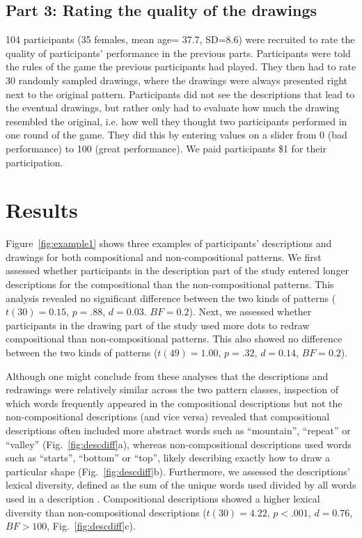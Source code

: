 \documentclass[a4paper,man, floatsintext, natbib]{apa6}
\begin{document}
\subsection{Part 3: Rating the quality of the drawings}

104 participants (35 females, mean age= 37.7, SD=8.6) were recruited to rate the quality of participants' performance in the previous parts. Participants were told the rules of the game the previous participants had played. They then had to rate 30 randomly sampled drawings, where the drawings were always presented right next to the original pattern. Participants did not see the descriptions that lead to the eventual drawings, but rather only had to evaluate how much the drawing resembled the original, i.e. how well they thought two participants performed in one round of the game. They did this by entering values on a slider from 0 (bad performance) to 100 (great performance). We paid participants \$1 for their participation.

\section{Results}

Figure~\ref{fig:example1} shows three examples of participants' descriptions and drawings for both compositional and non-compositional patterns. We first assessed whether participants in the description part of the study entered longer descriptions for the compositional than the non-compositional patterns. This analysis revealed no significant difference between the two kinds of patterns ($t(30)=0.15$, $p=.88$, $d=0.03$. $BF=0.2$). Next, we assessed whether participants in the drawing part of the study used more dots to redraw compositional than non-compositional patterns. This also showed no difference between the two kinds of patterns ($t(49)=1.00$, $p=.32$, $d=0.14$, $BF=0.2$).

Although one might conclude from these analyses that the descriptions and redrawings were relatively similar across the two pattern classes, inspection of which words frequently appeared in the compositional descriptions but not the non-compositional descriptions (and vice versa) revealed that compositional descriptions often included more abstract words such as ``mountain'', ``repeat'' or ``valley'' (Fig.~\ref{fig:descdiff}a), whereas non-compositional descriptions used words such as ``starts'', ``bottom'' or ``top'', likely describing exactly how to draw a particular shape (Fig.~\ref{fig:descdiff}b). Furthermore, we assessed the descriptions' lexical diversity, defined as the sum of the unique words used divided by all words used in a description \citep{mccarthy2010mtld}. Compositional descriptions showed a higher lexical diversity than non-compositional descriptions ($t(30)=4.22$, $p<.001$, $d=0.76$, $BF>100$, Fig.~\ref{fig:descdiff}c).
\end{document}
